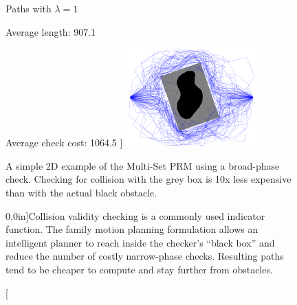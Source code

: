 \begin{figure}
      \centering
      Paths with $\lambda = 1$\par
      Average length: 907.1\par
      Average check cost: 1064.5
   ]{
      \includegraphics[width=0.45\textwidth]
      {figs/bean-allpaths-padded-lambda1.png}
   }

   \caption{A simple 2D example of the Multi-Set PRM using
     a broad-phase check.
     Checking for collision with the grey box is 10x less expensive
     than with the actual black obstacle.}
   \label{fig:broad-phase-2d}
\end{figure}

\begin{figure}
   \centering
   
   \quad%
   
   \caption[][0.0in]{Collision validity checking is a commonly used
     indicator function.
     The family motion planning formulation allows an intelligent
     planner to reach inside the checker's ``black box''
     and reduce the number of costly narrow-phase checks.
     Resulting paths tend to be cheaper to compute and
     stay further from obstacles.}
   \label{fig:broad-phase}
\end{figure}

